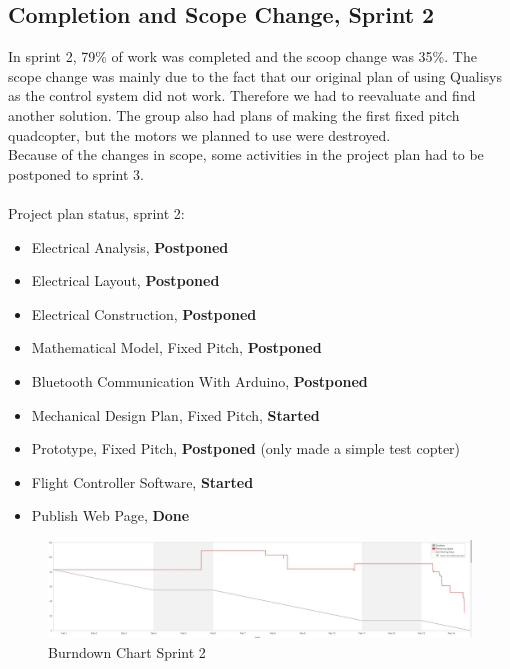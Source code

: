 \subsection{Completion and Scope Change, Sprint 2}


In sprint 2, 79\% of work was completed and the scoop change was 35\%. The scope change was mainly due to the fact that our original plan of using Qualisys as the control system did not work. Therefore we had to reevaluate and find another solution. The group also had plans of making the first fixed pitch quadcopter, but the motors we planned to use were destroyed. 
\\
Because of the changes in scope, some activities in the project plan had to be postponed to sprint 3.
\\\\
Project plan status, sprint 2:

\begin{itemize}
    \item 	Electrical Analysis, \textbf{Postponed}
    \item   Electrical Layout, \textbf{Postponed}
    \item   Electrical Construction, \textbf{Postponed}
    \item   Mathematical Model, Fixed Pitch, \textbf{Postponed}
    \item 	Bluetooth Communication With Arduino, \textbf {Postponed}
    \item 	Mechanical Design Plan, Fixed Pitch, \textbf{Started}
    \item 	Prototype, Fixed Pitch, \textbf{Postponed} (only made a simple test copter)
   	\item   Flight Controller Software, \textbf{Started}
    \item 	Publish Web Page, \textbf{Done}
\end{itemize}

\begin{figure}[h]
        \centering
        \includegraphics[width = 1
        \textwidth]{VAPIQ-PICTURES//SprintBD2}
         \caption{Burndown Chart Sprint 2}
       
    \end{figure}    

